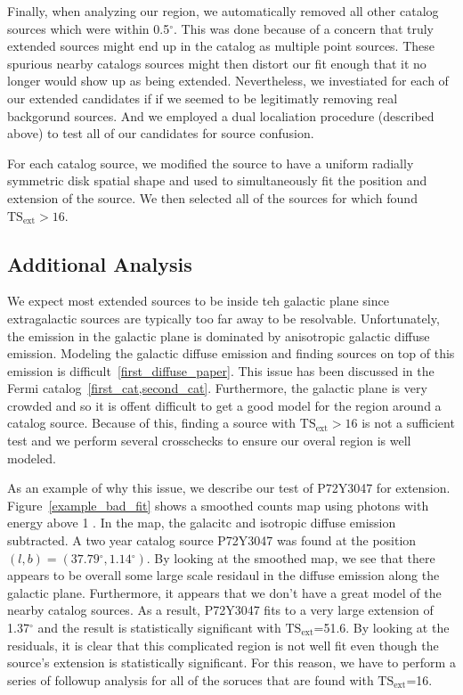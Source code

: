 \documentclass[12pt,preprint]{aastex}
\newcommand{\gev}{\text{GeV}\xspace}
\newcommand{\tsext}{{\ensuremath{\text{TS}_\text{ext}}}\xspace}
\renewcommand{\deg}{\ensuremath{^\circ}\xspace}
\newcommand{\pointlike}{\text{\em pointlike}\xspace}
\begin{document}
Finally, when analyzing our region, we automatically removed all other
catalog sources which were within 0.5\deg. This was done because of
a concern that truly extended sources might end up in the catalog as
multiple point sources. These spurious nearby catalogs sources might then
distort our fit enough that it no longer would show up as being extended.
Nevertheless, we investiated for each of our extended candidates if
if we seemed to be legitimatly removing real backgorund sources. And
we employed a dual localiation procedure (described above) to test
all of our candidates for source confusion.

For each catalog source, we modified the source to have a uniform radially
symmetric disk spatial shape and used \pointlike to simultaneously fit
the position and extension of the source.  We then selected all of the
sources for which \pointlike found $\tsext>16$.

\subsection{Additional Analysis}

We expect most extended sources to be inside teh galactic plane
since extragalactic sources are typically too far away to be
resolvable. Unfortunately, the \gev emission in the galactic plane
is dominated by anisotropic galactic diffuse emission.  Modeling the
galactic diffuse emission and finding sources on top of this emission is
difficult~\ref{first_diffuse_paper}. This issue has been discussed in the
Fermi catalog~\ref{first_cat,second_cat}. Furthermore, the galactic plane is
very crowded and so it is offent difficult to get a good model for the
region around a catalog source.  Because of this, finding a source with
$\tsext>16$ is not a sufficient test and we perform several crosschecks
to ensure our overal region is well modeled.


As an example of why this issue, we describe our test of P72Y3047 for
extension.  Figure~\ref{example_bad_fit} shows a smoothed counts map
using photons with energy above 1 \gev. In the map, the galacitc and isotropic diffuse
emission subtracted.  A two year catalog source P72Y3047 was found at the
position $(l,b)=(37.79\deg,1.14\deg)$.  By looking at the smoothed map,
we see that there appears to be overall some large scale residaul in the
diffuse emission along the galactic plane. Furthermore, it appears that
we don't have a great model of the nearby catalog sources. As a result,
P72Y3047 fits to a very large extension of 1.37\deg and the result is
statistically significant with \tsext=51.6.  By looking at the residuals,
it is clear that this complicated region is not well fit even though
the source's extension is statistically significant. For this reason,
we have to perform a series of followup analysis for all of the soruces
that are found with \tsext=16.
\end{document}
